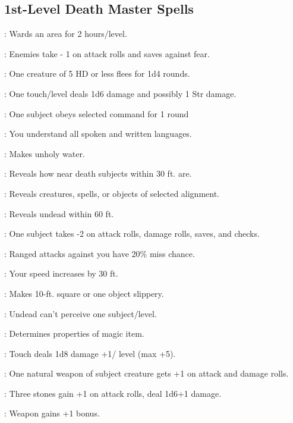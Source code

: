 \begin{multicols}{2}
\subsection{1st-Level Death Master Spells}
\begin{description*}
\item[\linkspell{Alarm}:] Wards an area for 2 hours/level.
\item[\linkspell{Bane}:] Enemies take - 1 on attack rolls and saves against fear.
\item[\linkspell{Cause Fear}:] One creature of 5 HD or less flees for 1d4 rounds.
\item[\linkspell{Chill Touch}:] One touch/level deals 1d6 damage and possibly 1 Str damage.
\item[\linkspell{Command}:] One subject obeys selected command for 1 round
\item[\linkspell{Comprehend Languages}:] You understand all spoken and written languages.
\item[\linkspell{Curse Water}:] Makes unholy water.
\item[\linkspell{Deathwatch}:] Reveals how near death subjects within 30 ft. are.
\item[\linkspell{Detect Chaos/Evil/Good/Law}:] Reveals creatures, spells, or objects of selected alignment.
\item[\linkspell{Detect Undead}:] Reveals undead within 60 ft.
\item[\linkspell{Doom}:] One subject takes -2 on attack rolls, damage rolls, saves, and checks.
\item[\linkspell{Entropic Shield}:] Ranged attacks against you have 20\% miss chance.
\item[\linkspell{Expeditious Retreat}:] Your speed increases by 30 ft.
\item[\linkspell{Grease}:] Makes 10-ft. square or one object slippery.
\item[\linkspell{Hide from Undead}:] Undead can't perceive one subject/level.
\item[\linkspell{Identify}:] Determines properties of magic item.
\item[\linkspell{Inflict Light Wounds}:] Touch deals 1d8 damage +1/ level (max +5).
\item[\linkspell{Magic Fang}:] One natural weapon of subject creature gets +1 on attack and damage rolls.
\item[\linkspell{Magic Stone}:] Three stones gain +1 on attack rolls, deal 1d6+1 damage.
\item[\linkspell{Magic Weapon}:] Weapon gains +1 bonus.

\end{description*}
\end{multicols}
